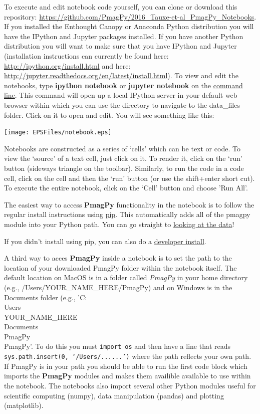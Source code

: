 \documentclass[11pt]{book}
\begin{document}
{{{{{{To execute and edit notebook code yourself, you can clone or download this repository: \url{https://github.com/PmagPy/2016_Tauxe-et-al_PmagPy_Notebooks}.  If you installed the Enthought Canopy or Anaconda Python distribution you will have the IPython and Jupyter packages installed. If you have another Python distribution you will want to make sure that you have IPython and Jupyter (installation instructions can currently be found here: \url{http://ipython.org/install.html} and here: \url{http://jupyter.readthedocs.org/en/latest/install.html}). To view and edit the notebooks,  type {\bf ipython notebook} or {\bf jupyter notebook} on the \href{#command_line}{command line}.  This command will open up a local IPython server in your default web browser within which you can use the directory to navigate to the data\_files folder. Click on it to open and edit. You will see something like this:

\texttt{[image: EPSFiles/notebook.eps]}

Notebooks are constructed as a series of `cells' which can be text or code.  To view the `source' of a text cell, just click on it.  To render it, click on the `run' button (sideways triangle on the toolbar).  Similarly, to run the code in a code cell, click on the cell and then the `run' button (or use the shift+enter short cut).   To execute the entire notebook, click on the `Cell' button and choose 'Run All'.

The easiest way to access {\bf PmagPy} functionality in the notebook is to follow the regular install instructions using \href{#pip_install}{pip}.  This automatically adds all of the pmagpy module into your Python path.  You can go straight to \href{#notebook_start}{looking at the data}!

If you didn't install using pip, you can also do a \href{#developer_install}{developer install}.

A third way to acces {\bf PmagPy} inside a notebook is to set the path to the location of your downloaded PmagPy folder within the notebook itself. The default location on  MacOS is in a folder called {\it PmagPy} in your home directory (e.g., /Users/YOUR\_NAME\_HERE/PmagPy) and on Windows is in the Documents folder (e.g., 'C:\\Users\\YOUR\_NAME\_HERE\\Documents\\PmagPy\\PmagPy'. To do this you must \texttt{import os} and then have a line that reads \texttt{sys.path.insert(0, `/Users/......')} where the path reflects your own path.   If PmagPy is in your path you should be able to run the first code block which imports the {\bf PmagPy} modules and makes them availible available to use within the notebook.  The notebooks also import several other Python modules useful for scientific computing (numpy),  data manipulation (pandas) and plotting (matplotlib).

}}}}}}
\end{document}
